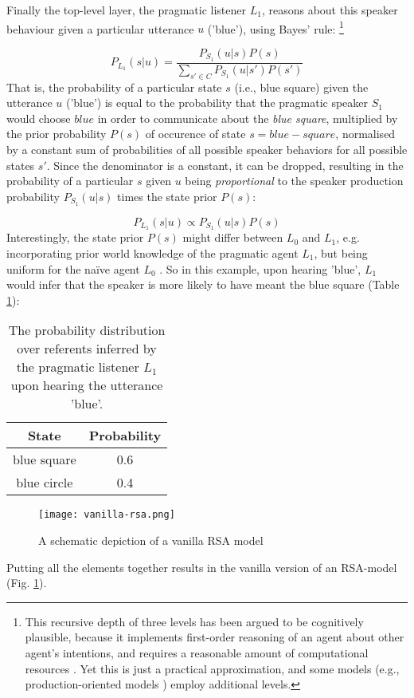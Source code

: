 Finally the top-level layer, the pragmatic listener $L_1$, reasons about this speaker behaviour given a particular utterance $u$ ('blue'), using Bayes' rule: \footnote{This recursive depth of three levels has been argued to be cognitively plausible, because it implements first-order reasoning of an agent about other agent's intentions, and requires a reasonable amount of computational resources \parencite{frank2012predicting}. Yet this is just a practical approximation, and some models (e.g., production-oriented models ) employ additional levels.\parencite{problang}}
 
$$P_{L_1}(s | u) = \frac{P_{S_1}(u | s) P(s)}{\sum_{s' \in C} P_{S_1}(u | s') P(s')}$$
That is, the probability of a particular state $s$ (i.e., blue square) given the utterance $u$ ('blue') is equal to the probability that the pragmatic speaker $S_1$ would choose $blue$ in order to communicate about the \textit{blue square}, multiplied by the prior probability $P(s)$ of occurence of state $s = blue-square$, normalised by a constant sum of probabilities of all possible speaker behaviors for all possible states $s'$. Since the denominator is a constant, it can be dropped, resulting in the probability of a particular $s$ given $u$ being \emph{proportional} to the speaker production probability $P_{S_1}(u | s)$ times the state prior $P(s)$:

$$P_{L_1}(s | u) \propto P_{S_1}(u | s) P(s)$$ 
Interestingly, the state prior $P(s)$ might differ between $L_0$ and $L_1$, e.g. incorporating prior world knowledge of the pragmatic agent $L_1$, but being uniform for the na\"ive agent $L_0$ \parencite{problang}. So in this example, upon hearing 'blue', $L_1$ would infer that the speaker is more likely to have meant the blue square (Table \ref{rsa-l1}):

\begin{table}[h]
	\begin{center}
		\caption{The probability distribution over referents inferred by the pragmatic listener $L_1$ upon hearing the utterance 'blue'.}
		\label{rsa-l1}
		\vskip 0.12in
		\begin{tabular}{cc}
			State & Probability \\
			\hline
			blue square & 0.6 \\
			blue circle & 0.4
		\end{tabular}
	\end{center}
\end{table}

\begin{figure*}[t]
	\begin{center}
		\texttt{[image: vanilla-rsa.png]}
	\end{center}
	\vspace{-0.3cm}
	\caption{A schematic depiction of a vanilla RSA model \parencite{problang}}
	\label{vanilla-rsa}
\end{figure*}
Putting all the elements together results in the vanilla version of an RSA-model (Fig. \ref{vanilla-rsa}).

